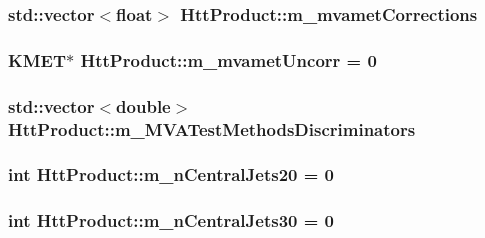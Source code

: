 \label{classHttProduct_a44f387057d5dafe967b68fd5eb58a79f}
\hypertarget{classHttProduct_a17c2bf4e38deeba8621905cf106e334d}{
\subsubsection[{m\_\-mvametCorrections}]{\setlength{\rightskip}{0pt plus 5cm}std::vector$<$float$>$ {\bf HttProduct::m\_\-mvametCorrections}}}
\label{classHttProduct_a17c2bf4e38deeba8621905cf106e334d}
\hypertarget{classHttProduct_a45f94abd585fbce86a75e170bd5e17d9}{
\subsubsection[{m\_\-mvametUncorr}]{\setlength{\rightskip}{0pt plus 5cm}KMET$\ast$ {\bf HttProduct::m\_\-mvametUncorr} = 0}}
\label{classHttProduct_a45f94abd585fbce86a75e170bd5e17d9}
\hypertarget{classHttProduct_a5edebff621a1c9c48bed3a53bd7d0749}{
\subsubsection[{m\_\-MVATestMethodsDiscriminators}]{\setlength{\rightskip}{0pt plus 5cm}std::vector$<$double$>$ {\bf HttProduct::m\_\-MVATestMethodsDiscriminators}}}
\label{classHttProduct_a5edebff621a1c9c48bed3a53bd7d0749}
\hypertarget{classHttProduct_a29fc4394e47bea58d6477ee8f7ead81e}{
\subsubsection[{m\_\-nCentralJets20}]{\setlength{\rightskip}{0pt plus 5cm}int {\bf HttProduct::m\_\-nCentralJets20} = 0}}
\label{classHttProduct_a29fc4394e47bea58d6477ee8f7ead81e}
\hypertarget{classHttProduct_abb86def8117c39e95b455f4e054cea06}{
\subsubsection[{m\_\-nCentralJets30}]{\setlength{\rightskip}{0pt plus 5cm}int {\bf HttProduct::m\_\-nCentralJets30} = 0}}
